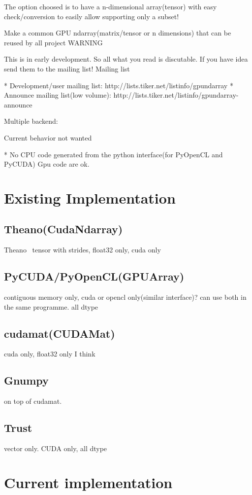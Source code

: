 \documentclass{article} %
\begin{document}
The option choosed is to have a n-dimensional array(tensor) with easy
check/conversion to easily allow supporting only a subset!

Make a common GPU ndarray(matrix/tensor or n dimensions) that can be reused by all project
WARNING

This is in early development. So all what you read is discutable. If you have idea send them to the mailing list!
Mailing list

    * Development/user mailing list: http://lists.tiker.net/listinfo/gpundarray
    * Announce mailing list(low volume): http://lists.tiker.net/listinfo/gpundarray-announce

Multiple backend:

Current behavior not wanted

    * No CPU code generated from the python interface(for PyOpenCL and PyCUDA) Gpu code are ok.


\section{Existing Implementation}
\subsection{Theano(CudaNdarray)}
Theano~\citep{bergstra+al:2010-scipy}
tensor with strides, float32 only, cuda only
\subsection{PyCUDA/PyOpenCL(GPUArray)}
contiguous memory only, cuda or opencl only(similar interface)?
can use both in the same programme. all dtype
\subsection{cudamat(CUDAMat)}
cuda only, float32 only I think
\subsection{Gnumpy}
on top of cudamat.
\subsection{Trust}
vector only. CUDA only, all dtype

\section{Current implementation}
\end{document}

